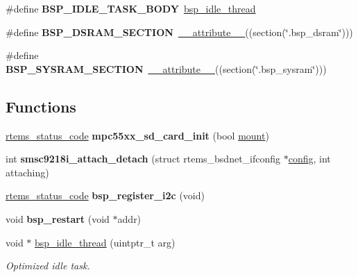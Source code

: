 \begin{DoxyCompactItemize}
\#define {\bfseries B\+S\+P\+\_\+\+I\+D\+L\+E\+\_\+\+T\+A\+S\+K\+\_\+\+B\+O\+DY}~\mbox{\hyperlink{group__RTEMSBSPsSPARCLEON3_ga301be7085b80c41a9c5887247003c662}{bsp\+\_\+idle\+\_\+thread}}
\item 
\mbox{\label{group__RTEMSBSPsPowerPCMPC55XX_ga434fb278cd269832ef8797a809f17d46}} 
\#define {\bfseries B\+S\+P\+\_\+\+D\+S\+R\+A\+M\+\_\+\+S\+E\+C\+T\+I\+ON}~\mbox{\hyperlink{struct____attribute____}{\+\_\+\+\_\+attribute\+\_\+\+\_\+}}((section(\char`\"{}.bsp\+\_\+dsram\char`\"{})))
\item 
\mbox{\label{group__RTEMSBSPsPowerPCMPC55XX_gaf2ed4519175143d048269d689b466626}} 
\#define {\bfseries B\+S\+P\+\_\+\+S\+Y\+S\+R\+A\+M\+\_\+\+S\+E\+C\+T\+I\+ON}~\mbox{\hyperlink{struct____attribute____}{\+\_\+\+\_\+attribute\+\_\+\+\_\+}}((section(\char`\"{}.bsp\+\_\+sysram\char`\"{})))
\end{DoxyCompactItemize}
\subsection*{Functions}
\begin{DoxyCompactItemize}
\item 
\mbox{\label{group__RTEMSBSPsPowerPCMPC55XX_ga199ddeab1255d89ddf244ce534ad1d8c}} 
\mbox{\hyperlink{group__ClassicStatus_ga545d41846817eaba6143d52ee4d9e9fe}{rtems\+\_\+status\+\_\+code}} {\bfseries mpc55xx\+\_\+sd\+\_\+card\+\_\+init} (bool \mbox{\hyperlink{group__FileSystemTypesAndMount_gaf3c1bed49bb0f3dec88d330b4f88d48b}{mount}})
\item 
\mbox{\label{group__RTEMSBSPsPowerPCMPC55XX_gaf4ff44e324dae103a062c5882434d09c}} 
int {\bfseries smsc9218i\+\_\+attach\+\_\+detach} (struct rtems\+\_\+bsdnet\+\_\+ifconfig $\ast$\mbox{\hyperlink{structconfig__s}{config}}, int attaching)
\item 
\mbox{\label{group__RTEMSBSPsPowerPCMPC55XX_ga58027abea7da23dc91a07af3260fa365}} 
\mbox{\hyperlink{group__ClassicStatus_ga545d41846817eaba6143d52ee4d9e9fe}{rtems\+\_\+status\+\_\+code}} {\bfseries bsp\+\_\+register\+\_\+i2c} (void)
\item 
\mbox{\label{group__RTEMSBSPsPowerPCMPC55XX_ga22e8ff0c484a388835087ab82844fa5b}} 
void {\bfseries bsp\+\_\+restart} (void $\ast$addr)
\item 
void $\ast$ \mbox{\hyperlink{group__RTEMSBSPsPowerPCMPC55XX_ga4617d29eb64a6f41a54d9f997b97d758}{bsp\+\_\+idle\+\_\+thread}} (uintptr\+\_\+t arg)
\begin{DoxyCompactList}\small\item\em Optimized idle task. \end{DoxyCompactList}\end{DoxyCompactItemize}
